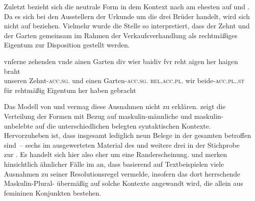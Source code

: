
Zuletzt bezieht sich die neutrale Form   in
 dem Kontext nach am ehesten auf 
 und  . Da es sich bei den Ausstellern
der Urkunde um die drei Brüder  \autocites(Nrn.~1201~AB)[472,6--7]{cao2} handelt, wird
sich  nicht auf   beziehen. Vielmehr wurde die
Stelle so interpretiert, dass der Zehnt und der Garten gemeinsam im Rahmen der
Verkaufsverhandlung als rechtmäßiges Eigentum zur Disposition gestellt werden.

\begin{exe}
\ex \label{ex:m+m_beidiu_5}
	\gll vnſerne zehenden \textelp{} vnde ainen Garten \textelp{} div wier
			baidiv fvr reht aigen her haigen braht \\
		unseren Zehnt-\textsc{acc.sg.\MascI} {} und einen
		Garten-\textsc{acc.sg.\MascI} {} \textsc{rel.acc.pl.\NeutI} wir
		beide-\textsc{acc.pl.\NeutI.st} für rehtmäßig Eigentum her haben
		gebracht \\
	\trans {}
		\parencites(Nrn.~1201~AB, Kl.~Heiligkreuztal, Kr.~Biberach, 1290)[472,10--14]{cao2}
\end{exe}

Das Modell von \citet{wechsler2009} und \citet{wechslerzlatic2003} vermag diese
Ausnahmen nicht zu erklären.  zeigt die
Verteilung der Formen mit Bezug auf maskulin-männliche und
maskulin-unbelebte  auf die unterschiedlichen
belegten syntaktischen Kontexte. Hervorzuheben ist, dass insgesamt lediglich
neun Belege in der gesamten  betroffen sind~-- sechs im
ausgewerteten Material des \CAO{} und weitere drei in der Stichprobe zur \KC{}.
Es handelt sich hier also eher um eine Randerscheinung.
\citet[190]{wechslerzlatic2003} und \citet[581]{wechsler2009} merken
hinsichtlich ähnlicher Fälle im  an, dass
\citet{corbett1983,corbett1991} basierend auf Textbeispielen viele Ausnahmen zu
seiner Resolutionsregel vermelde, insofern das dort herrschende
Maskulin-Plural- übermäßig auf solche Kontexte
angewandt wird, die allein aus femininen Konjunkten bestehen.

